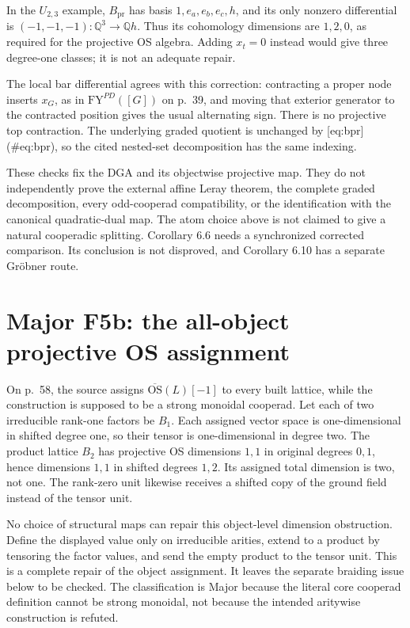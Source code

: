 \documentclass[10pt]{article}
\begin{document}
In the \(U_{2,3}\) example, \(B_{\mathrm{pr}}\) has basis \(1,e_a,e_b,e_c,h\), and its only nonzero differential is \((-1,-1,-1):\mathbb Q^3\to\mathbb Qh\). Thus its cohomology dimensions are \(1,2,0\), as required for the projective OS algebra. Adding \(x_t=0\) instead would give three degree-one classes; it is not an adequate repair.\par
The local bar differential agrees with this correction: contracting a proper node inserts \(x_G\), as in \(\mathrm{FY}^{PD}([G])\) on p. 39, and moving that exterior generator to the contracted position gives the usual alternating sign. There is no projective top contraction. The underlying graded quotient is unchanged by [eq:bpr] (\#eq:bpr), so the cited nested-set decomposition has the same indexing.\par
These checks fix the DGA and its objectwise projective map. They do not independently prove the external affine Leray theorem, the complete graded decomposition, every odd-cooperad compatibility, or the identification with the canonical quadratic-dual map. The atom choice above is not claimed to give a natural cooperadic splitting. Corollary 6.6 needs a synchronized corrected comparison. Its conclusion is not disproved, and Corollary 6.10 has a separate Gröbner route.\par
\section*{Major F5b: the all-object projective OS assignment}
On p. 58, the source assigns \(\overline{\mathrm{OS}}(L)[-1]\) to every built lattice, while the construction is supposed to be a strong monoidal cooperad. Let each of two irreducible rank-one factors be \(B_1\). Each assigned vector space is one-dimensional in shifted degree one, so their tensor is one-dimensional in degree two. The product lattice \(B_2\) has projective OS dimensions \(1,1\) in original degrees \(0,1\), hence dimensions \(1,1\) in shifted degrees \(1,2\). Its assigned total dimension is two, not one. The rank-zero unit likewise receives a shifted copy of the ground field instead of the tensor unit.\par
No choice of structural maps can repair this object-level dimension obstruction. Define the displayed value only on irreducible arities, extend to a product by tensoring the factor values, and send the empty product to the tensor unit. This is a complete repair of the object assignment. It leaves the separate braiding issue below to be checked. The classification is Major because the literal core cooperad definition cannot be strong monoidal, not because the intended aritywise construction is refuted.\par
\end{document}
